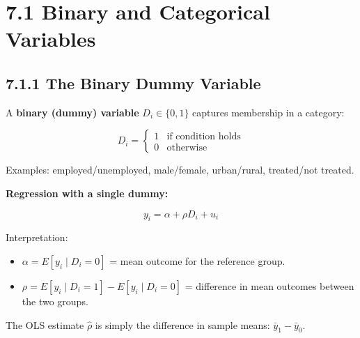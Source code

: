 \section{7.1 Binary and Categorical Variables}

\subsection{7.1.1 The Binary Dummy Variable}

A \textbf{binary (dummy) variable} $D_i \in \{0, 1\}$ captures membership in a category:

\[
D_i = \begin{cases} 1 & \text{if condition holds} \\ 0 & \text{otherwise} \end{cases}
\]

Examples: employed/unemployed, male/female, urban/rural, treated/not treated.

\textbf{Regression with a single dummy:}

\[
y_i = \alpha + \rho D_i + u_i
\]

Interpretation:
\begin{itemize}
\item $\alpha = E[y_i \mid D_i = 0]$ = mean outcome for the reference group.
\item $\rho = E[y_i \mid D_i = 1] - E[y_i \mid D_i = 0]$ = difference in mean outcomes between the two groups.
\end{itemize}

The OLS estimate $\hat{\rho}$ is simply the difference in sample means: $\bar{y}_1 - \bar{y}_0$.

